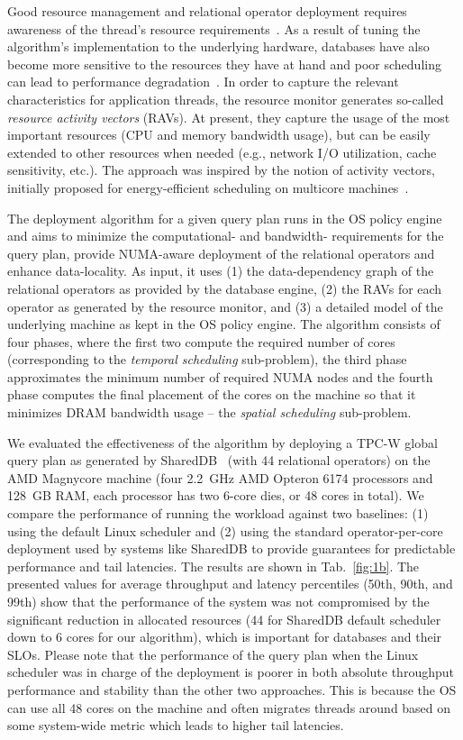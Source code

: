 \documentclass[11pt]{article}
\begin{document}
Good resource management and relational operator deployment requires awareness of 
the thread's resource requirements~\cite{Ailamaki:vldb99, manegold:vldb00, li2013numa}. 
As a result of tuning the algorithm's implementation to the underlying hardware, 
databases have also become more sensitive to the resources they have at hand and 
poor scheduling can lead to performance degradation~\cite{Lee:2009,cod:2013}.
In order to capture the relevant characteristics for application threads, the resource monitor
generates so-called {\it resource activity vectors} (RAVs). At present, they capture the usage 
of the most important resources (CPU and memory bandwidth usage), but can be easily extended to 
other resources when needed (e.g., network I/O utilization, cache sensitivity, etc.).
The approach was inspired by the notion of activity vectors, initially proposed for 
energy-efficient scheduling on multicore machines~\cite{merkel2010}.

The deployment algorithm for a given query plan runs in the OS policy engine and aims to 
minimize the computational- and bandwidth- requirements for the query plan, provide NUMA-aware
deployment of the relational operators and enhance data-locality. As input, it uses (1) the 
data-dependency graph of the relational operators as provided by the database engine, (2)
the RAVs for each operator as generated by the resource monitor, and (3) a detailed model of 
the underlying machine as kept in the OS policy engine. 
The algorithm consists of four phases, where the first two compute the required number of
cores (corresponding to the {\it temporal scheduling} sub-problem), the third phase 
approximates the minimum number of required NUMA nodes and the fourth phase computes
the final placement of the cores on the machine so that it minimizes DRAM bandwidth usage
-- the {\it spatial scheduling} sub-problem.

We evaluated the effectiveness of the algorithm by deploying a TPC-W global query plan as 
generated by SharedDB~\cite{SharedDB} (with 44 relational operators) on the AMD 
Magnycore machine (four 2.2~GHz AMD 
Opteron 6174 processors and 128~GB RAM, each processor has two 6-core dies, or 48 cores
in total). We compare the performance of running the workload
against two baselines: (1) using the default Linux scheduler and (2) using the standard 
operator-per-core deployment used by systems like SharedDB to provide guarantees for
predictable performance and tail latencies. The results are shown in Tab.~\ref{fig:1b}. 
The presented values for average throughput and latency percentiles (50th, 90th, and 99th) 
show that the performance of the system was not compromised by the significant 
reduction in allocated resources (44 for SharedDB default scheduler down to 6 cores for 
our algorithm), which is important for databases and their SLOs. Please note that the 
performance of the query plan when the Linux scheduler was in charge of the deployment
is poorer in both absolute throughput performance and stability than the other two 
approaches. This is because the OS can use all 48 cores on the machine and often migrates 
threads around based on some system-wide metric which leads to higher tail latencies.
\end{document}
